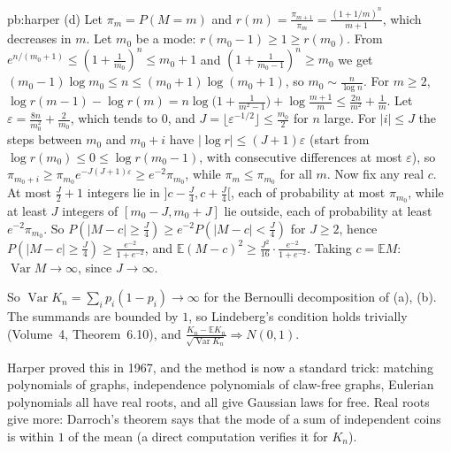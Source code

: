 \begin{solution}{pb:harper}
(d) Let $\pi_m=P(M=m)$ and $r(m)=\frac{\pi_{m+1}}{\pi_m}=\frac{(1+1/m)^n}{m+1}$, which decreases in $m$. Let $m_0$ be a mode: $r(m_0-1)\ge1\ge r(m_0)$. From
$e^{n/(m_0+1)}\le(1+\frac1{m_0})^n\le m_0+1$ and $(1+\frac1{m_0-1})^n\ge m_0$ we get $(m_0-1)\log m_0\le n\le(m_0+1)\log(m_0+1)$, so $m_0\sim\frac n{\log n}$.
For $m\ge2$, $\log r(m-1)-\log r(m)=n\log\bigl(1+\frac1{m^2-1}\bigr)+\log\frac{m+1}m\le\frac{2n}{m^2}+\frac1m$. Let $\varepsilon=\frac{8n}{m_0^2}+\frac2{m_0}$, which tends to $0$,
and $J=\lfloor\varepsilon^{-1/2}\rfloor\le\frac{m_0}2$ for $n$ large. For $|i|\le J$ the steps between $m_0$ and $m_0+i$ have $|\log r|\le(J+1)\varepsilon$ (start from
$\log r(m_0)\le0\le\log r(m_0-1)$, with consecutive differences at most $\varepsilon$), so $\pi_{m_0+i}\ge\pi_{m_0}e^{-J(J+1)\varepsilon}\ge e^{-2}\pi_{m_0}$, while $\pi_m\le\pi_{m_0}$ for
all $m$. Now fix any real $c$. At most $\frac J2+1$ integers lie in $]c-\frac J4,c+\frac J4[$, each of probability at most $\pi_{m_0}$, while at least $J$ integers of $[m_0-J,m_0+J]$ lie
outside, each of probability at least $e^{-2}\pi_{m_0}$. So $P(|M-c|\ge\frac J4)\ge e^{-2}P(|M-c|<\frac J4)$ for $J\ge2$, hence $P(|M-c|\ge\frac J4)\ge\frac{e^{-2}}{1+e^{-2}}$, and
$\mathbb E(M-c)^2\ge\frac{J^2}{16}\cdot\frac{e^{-2}}{1+e^{-2}}$. Taking $c=\mathbb EM$: $\operatorname{Var}M\to\infty$, since $J\to\infty$.

So $\operatorname{Var}K_n=\sum_ip_i(1-p_i)\to\infty$ for the Bernoulli decomposition of (a), (b). The summands are bounded by $1$, so Lindeberg's condition holds trivially
(Volume~4, Theorem~6.10), and $\frac{K_n-\mathbb EK_n}{\sqrt{\operatorname{Var}K_n}}\Rightarrow N(0,1)$.

\leads Harper proved this in 1967, and the method is now a standard trick: matching polynomials of graphs, independence polynomials of claw-free graphs, Eulerian
polynomials all have real roots, and all give Gaussian laws for free. Real roots give more: Darroch's theorem says that the mode of a sum of independent coins is within
$1$ of the mean (a direct computation verifies it for $K_n$).
\end{solution}

